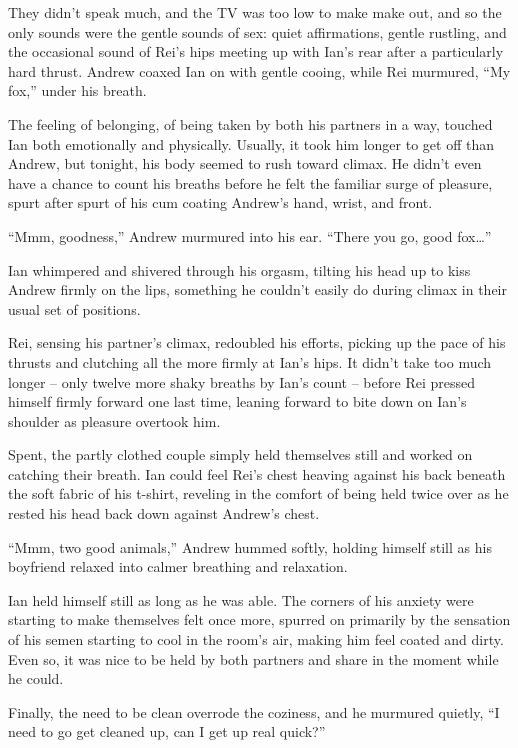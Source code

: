 They didn't speak much, and the TV was too low to make make out, and so the only sounds were the gentle sounds of sex: quiet affirmations, gentle rustling, and the occasional sound of Rei's hips meeting up with Ian's rear after a particularly hard thrust. Andrew coaxed Ian on with gentle cooing, while Rei murmured, ``My fox,'' under his breath.

The feeling of belonging, of being taken by both his partners in a way, touched Ian both emotionally and physically. Usually, it took him longer to get off than Andrew, but tonight, his body seemed to rush toward climax. He didn't even have a chance to count his breaths before he felt the familiar surge of pleasure, spurt after spurt of his cum coating Andrew's hand, wrist, and front.

``Mmm, goodness,'' Andrew murmured into his ear. ``There you go, good fox\ldots{}''

Ian whimpered and shivered through his orgasm, tilting his head up to kiss Andrew firmly on the lips, something he couldn't easily do during climax in their usual set of positions.

Rei, sensing his partner's climax, redoubled his efforts, picking up the pace of his thrusts and clutching all the more firmly at Ian's hips. It didn't take too much longer -- only twelve more shaky breaths by Ian's count -- before Rei pressed himself firmly forward one last time, leaning forward to bite down on Ian's shoulder as pleasure overtook him.

Spent, the partly clothed couple simply held themselves still and worked on catching their breath. Ian could feel Rei's chest heaving against his back beneath the soft fabric of his t-shirt, reveling in the comfort of being held twice over as he rested his head back down against Andrew's chest.

``Mmm, two good animals,'' Andrew hummed softly, holding himself still as his boyfriend relaxed into calmer breathing and relaxation.

Ian held himself still as long as he was able. The corners of his anxiety were starting to make themselves felt once more, spurred on primarily by the sensation of his semen starting to cool in the room's air, making him feel coated and dirty. Even so, it was nice to be held by both partners and share in the moment while he could.

Finally, the need to be clean overrode the coziness, and he murmured quietly, ``I need to go get cleaned up, can I get up real quick?''

